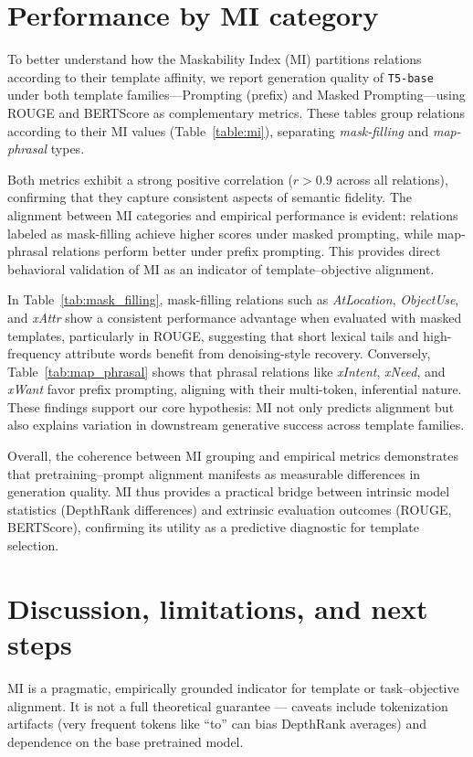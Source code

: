 \documentclass{i4c-en}
\begin{document}
\section{Performance by MI category}

To better understand how the Maskability Index (MI) partitions relations according to their template affinity, we report generation quality of \texttt{T5-base} under both template families—Prompting (prefix) and Masked Prompting—using ROUGE and BERTScore as complementary metrics. These tables group relations according to their MI values (Table~\ref{table:mi}), separating \emph{mask-filling} and \emph{map-phrasal} types.

Both metrics exhibit a strong positive correlation ($r>0.9$ across all relations), confirming that they capture consistent aspects of semantic fidelity. The alignment between MI categories and empirical performance is evident: relations labeled as mask-filling achieve higher scores under masked prompting, while map-phrasal relations perform better under prefix prompting. This provides direct behavioral validation of MI as an indicator of template–objective alignment.

In Table~\ref{tab:mask_filling}, mask-filling relations such as \textit{AtLocation}, \textit{ObjectUse}, and \textit{xAttr} show a consistent performance advantage when evaluated with masked templates, particularly in ROUGE, suggesting that short lexical tails and high-frequency attribute words benefit from denoising-style recovery. Conversely, Table~\ref{tab:map_phrasal} shows that phrasal relations like \textit{xIntent}, \textit{xNeed}, and \textit{xWant} favor prefix prompting, aligning with their multi-token, inferential nature. These findings support our core hypothesis: MI not only predicts alignment but also explains variation in downstream generative success across template families.

Overall, the coherence between MI grouping and empirical metrics demonstrates that pretraining–prompt alignment manifests as measurable differences in generation quality. MI thus provides a practical bridge between intrinsic model statistics (DepthRank differences) and extrinsic evaluation outcomes (ROUGE, BERTScore), confirming its utility as a predictive diagnostic for template selection.

	\section{Discussion, limitations, and next steps}
	MI is a pragmatic, empirically grounded indicator for template or task–objective alignment. It is not a full theoretical guarantee — caveats include tokenization artifacts (very frequent tokens like ``to'' can bias DepthRank averages) and dependence on the base pretrained model. 
	
\end{document}
